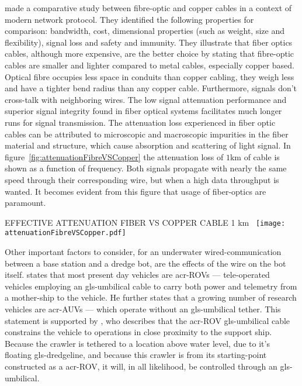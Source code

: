 \citet{babani_comparative_nodate} made a comparative study between fibre-optic and copper cables in a context of 
modern network protocol. They identified the following properties for comparison: bandwidth, cost, dimensional 
properties (such as weight, size and flexibility), signal loss and safety and immunity. They illustrate that fiber 
optics cables, although more expensive, are the better choice by stating that fibre-optic cables are smaller and 
lighter compared to metal cables, especially copper based. Optical fibre occupies less space in conduits than copper 
cabling, they weigh less and have a tighter bend radius than any copper cable. Furthermore, signals don't cross-talk 
with neighboring wires. The low signal attenuation performance and superior signal integrity found in fiber optical 
systems facilitates much longer runs for signal transmission. The attenuation loss experienced in fiber optic cables 
can be attributed to microscopic and macroscopic impurities in the fiber material and structure, which cause 
absorption and scattering of light signal. In figure~\ref{fig:attenuationFibreVSCopper} the attenuation loss of \( 1 
\si{\km} \) of cable is shown as a function of frequency. Both signals propagate with nearly the same speed through 
their corresponding wire, but when a high data throughput is wanted. It becomes evident from this figure that usage 
of fiber-optics are paramount.

\begin{RoyalFigure}[htb, label=fig:attenuationFibreVSCopper]{EFFECTIVE ATTENUATION FIBER VS COPPER CABLE 1 
km~\cite{joseph_c_palais_fibre_1998}}
    \texttt{[image: attenuationFibreVSCopper.pdf]}
\end{RoyalFigure}

Other important factors to consider, for an underwater wired-communication between a base station and a dredge bot, 
are the effects of the wire on the bot itself. \citet{whitcomb_underwater_2000} states that most present day vehicles
are \glspl{acr-ROV} --- tele-operated vehicles employing an \gls{gls-umbilical} cable to carry both power and 
telemetry from a mother-ship to the vehicle. He further states that a growing number of research vehicles are 
\glspl{acr-AUV} --- which operate without an \gls{gls-umbilical} tether. This statement is supported by 
\citet{valavanis_control_1997}, who describes that the \gls{acr-ROV} \gls{gls-umbilical} cable constrains the vehicle
to operations in close proximity to the support ship. Because the crawler is tethered to a location above water 
level, due to it's floating \gls{gls-dredgeline}, and because this crawler is from its starting-point constructed as 
a \gls{acr-ROV}, it will, in all likelihood, be controlled through an \gls{gls-umbilical}.

